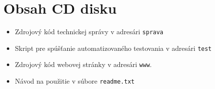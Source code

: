 
\chapter{Obsah CD disku}
    \begin{itemize}
        \item Zdrojový kód technickej správy v adresári \texttt{sprava}
        \item Skript pre spúšťanie automatizovaného testovania v adresári
            \texttt{test}
        \item Zdrojový kód webovej stránky v adresári \texttt{www}.    
        \item Návod na použitie v súbore \texttt{readme.txt}
    \end{itemize}
